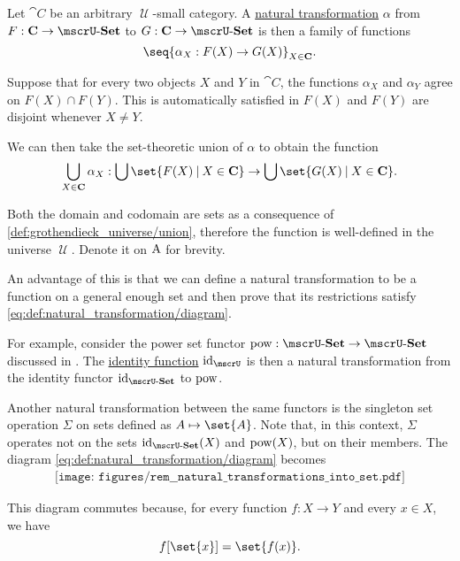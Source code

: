 \begin{remark}\label{rem:natural_transformations_into_set}
  Let \( \cat{C} \) be an arbitrary \( \mscrU \)-small category. A \hyperref[def:natural_transformation]{natural transformation} \( \alpha \) from \( F: \cat{C} \to \ucat{Set} \) to \( G: \cat{C} \to \ucat{Set} \) is then a family of functions
  \begin{equation*}
    \seq{ \alpha_X: F(X) \to G(X) }_{X \in \cat{C}}.
  \end{equation*}

  Suppose that for every two objects \( X \) and \( Y \) in \( \cat{C} \), the functions \( \alpha_X \) and \( \alpha_Y \) agree on \( F(X) \cap F(Y) \). This is automatically satisfied in \( F(X) \) and \( F(Y) \) are disjoint whenever \( X \neq Y \).

  We can then take the set-theoretic union of \( \alpha \) to obtain the function
  \begin{equation*}
    \bigcup_{X \in \cat{C}} \alpha_X: \bigcup\set{ F(X) \given X \in \cat{C} } \to \bigcup\set{ G(X) \given X \in \cat{C} }.
  \end{equation*}

  Both the domain and codomain are sets as a consequence of \ref{def:grothendieck_universe/union}, therefore the function is well-defined in the universe \( \mscrU \). Denote it on \( \operatorname{A} \) for brevity.

  An advantage of this is that we can define a natural transformation to be a function on a general enough set and then prove that its restrictions satisfy \eqref{eq:def:natural_transformation/diagram}.

  For example, consider the power set functor \( \pow: \ucat{Set} \to \ucat{Set} \) discussed in . The \hyperref[def:multi_valued_function/identity]{identity function} \( \id_\mscrU \) is then a natural transformation from the identity functor \( \id_{\ucat{Set}} \) to \( \operatorname{pow} \).

  Another natural transformation between the same functors is the singleton set operation \( \Sigma \) on sets defined as \( A \mapsto \set{ A } \). Note that, in this context, \( \Sigma \) operates not on the sets \( \id_{\ucat{Set}}(X) \) and \( \operatorname{pow}(X) \), but on their members. The diagram \eqref{eq:def:natural_transformation/diagram} becomes
  \begin{equation}\label{eq:rem:natural_transformations_into_set}
    \begin{aligned}
      \texttt{[image: figures/rem\_\_natural\_transformations\_into\_set.pdf]}
    \end{aligned}
  \end{equation}

  This diagram commutes because, for every function \( f: X \to Y \) and every \( x \in X \), we have
  \begin{equation*}
    f[\set{ x }] = \set{ f(x) }.
  \end{equation*}
\end{remark}

